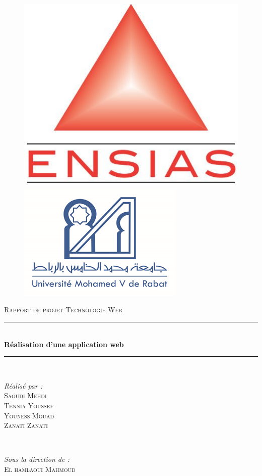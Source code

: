 \documentclass[11.5pt]{report}
\begin{document}
	
\begin{titlepage} 
	\begin{figure}[h]
		\begin{minipage}[c]{.46\linewidth}
			\flushleft
			\includegraphics[height=100 pt, width=120 pt]{Ensias2.jpg}
		
		\end{minipage}
		\hfill%
		\begin{minipage}[c]{.46\linewidth}
			\flushright
			\includegraphics[height=100 pt, width=120 pt]{um5.png}
		
		\end{minipage}
	\end{figure}
	
	
	\newcommand{\HRule}{\rule{\linewidth}{0.5mm}} %
	
	\centering 
	
	\vspace{2cm}
	
	\textsc{\LARGE Rapport de projet Technologie Web}\\[1.5cm] 
	
	\vspace{1cm}
	
	\HRule\\[0.4cm]
	
	{\huge\bfseries Réalisation d’une application web }\\[0.4cm] 
	
	\HRule\\[4cm]
	
	\begin{minipage}{0.4\textwidth}
		\begin{flushleft}
			\large
			\textit{Réalisé par :}\\
			\textsc{Saoudi Mehdi}\\ 
			\textsc{Tennia Youssef}\\ 
			\textsc{Youness Mouad}\\ 
			\textsc{Zanati Zanati}\\ 
		\end{flushleft}
	\end{minipage}
	~
	\begin{minipage}{0.4\textwidth}
		\begin{flushright}
			\large
			\textit{Sous la direction de :}\\
		    \textsc{El hamlaoui Mahmoud} 
		\end{flushright}
	\end{minipage}


\end{titlepage}
\end{document}
